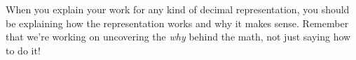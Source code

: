 \documentclass{ximera}
\begin{document}
%
%
%	
%	
%
%

When you explain your work for any kind of decimal representation, you should be explaining how the representation works and why it makes sense. Remember that we're working on uncovering the \emph{why} behind the math, not just saying how to do it!

%
\end{document}
